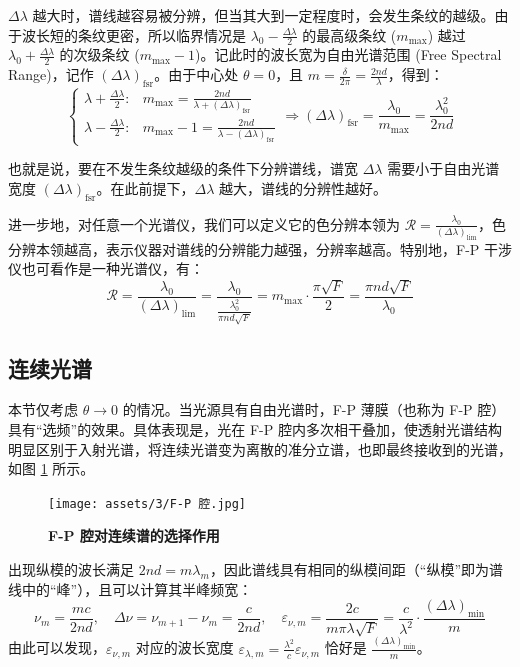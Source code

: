 \documentclass[UTF8]{report}
\theoremstyle{MyLineTheoremStyle} %
\theoremstyle{MyBlockTheoremStyle} %
\theoremstyle{MySubsubsectionStyle} %
\begin{document}
$\Delta \lambda$ 越大时，谱线越容易被分辨，但当其大到一定程度时，会发生条纹的越级。由于波长短的条纹更密，所以临界情况是 $ \lambda_0 - \frac{\Delta \lambda}{2}$ 的最高级条纹 ($m_{\max}$) 越过 $ \lambda_0 + \frac{\Delta \lambda}{2}$ 的次级条纹 ($m_{\max} - 1$)。记此时的波长宽为自由光谱范围 (Free Spectral Range)，记作 $\left(\Delta \lambda\right)_{\text{fsr}}$。由于中心处 $\theta = 0$，且 $m = \frac{\delta}{2\pi} = \frac{2 nd }{\lambda}$，得到：
\begin{equation}
\begin{cases}
    \lambda + \frac{\Delta \lambda}{2}: & m_{\max} = \frac{2 n d}{\lambda + \left(\Delta \lambda\right)_{\text{fsr}}} 
    \\ 
    \lambda - \frac{\Delta \lambda}{2}: & m_{\max} - 1 = \frac{2 n d}{\lambda - \left(\Delta \lambda\right)_{\text{fsr}}}
\end{cases}\Longrightarrow 
\left(\Delta \lambda\right)_{\text{fsr}} = \frac{\lambda_0}{m_{\max}} = \frac{\lambda_0^2}{2 n d} 
\end{equation}

也就是说，要在不发生条纹越级的条件下分辨谱线，谱宽 $\Delta \lambda$ 需要小于自由光谱宽度 $\left(\Delta \lambda\right)_{\text{fsr}}$。在此前提下，$\Delta \lambda$ 越大，谱线的分辨性越好。


进一步地，对任意一个光谱仪，我们可以定义它的色分辨本领为 $\mathscr{R} = \frac{\lambda_0}{\left(\Delta \lambda\right)_{\lim}}$，色分辨本领越高，表示仪器对谱线的分辨能力越强，分辨率越高。特别地，F-P 干涉仪也可看作是一种光谱仪，有：
\begin{equation}
\mathscr{R} = \frac{\lambda_0}{\left(\Delta \lambda\right)_{\lim}} = \frac{\lambda_0}{\frac{\lambda_0^2}{\pi n d \sqrt{F} }} = m_{\max} \cdot \frac{\pi \sqrt{F} }{2} = \frac{\pi n d \sqrt{F}}{\lambda_0}
\end{equation}



\subsection{连续光谱}

本节仅考虑 $\theta \to 0$ 的情况。当光源具有自由光谱时，F-P 薄膜（也称为 F-P 腔）具有“选频”的效果。具体表现是，光在 F-P 腔内多次相干叠加，使透射光谱结构明显区别于入射光谱，将连续光谱变为离散的准分立谱，也即最终接收到的光谱，如图 \ref{F-P 腔对连续谱的选择作用} 所示。
\begin{figure}[H]\centering
\texttt{[image: assets/3/F-P 腔.jpg]}
\caption{\bfseries F-P 腔对连续谱的选择作用}\label{F-P 腔对连续谱的选择作用}
\end{figure}
出现纵模的波长满足 $2nd = m\lambda_m$，因此谱线具有相同的纵模间距（“纵模”即为谱线中的“峰”），且可以计算其半峰频宽：
\begin{equation}
\nu_m = \frac{mc}{2nd},\quad \Delta \nu = \nu_{m+1} - \nu_m = \frac{c}{2nd},\quad \varepsilon_{\nu, m} = \frac{2c}{m \pi \lambda\sqrt{F}} = \frac{c}{\lambda^2} \cdot \frac{\left(\Delta \lambda\right)_{\min}}{m}
\end{equation}
由此可以发现，$\varepsilon_{\nu, m}$ 对应的波长宽度 $\varepsilon_{\lambda, m} = \frac{\lambda^2}{c} \varepsilon_{\nu, m}$ 恰好是 $\frac{\left(\Delta \lambda\right)_{\min}}{m}$。
\end{document}
